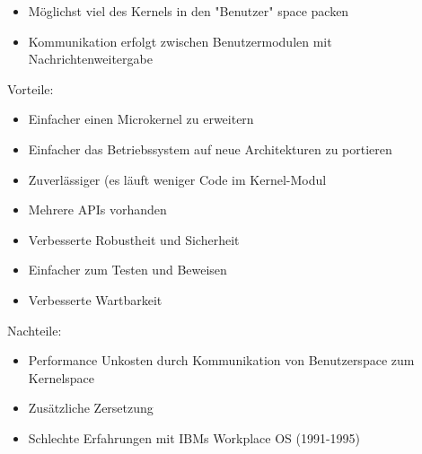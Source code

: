 \documentclass[a4paper]{scrreprt}
\begin{document}
	\begin{itemize}
		\item Möglichst viel des Kernels in den "Benutzer" space packen
		\item Kommunikation erfolgt zwischen Benutzermodulen mit Nachrichtenweitergabe
	\end{itemize}
	
	Vorteile:
		\begin{itemize}
			\item Einfacher einen Microkernel zu erweitern
			\item Einfacher das Betriebssystem auf neue Architekturen zu portieren
			\item Zuverlässiger (es läuft weniger Code im Kernel-Modul
			\item Mehrere APIs vorhanden
			\item Verbesserte Robustheit und Sicherheit
			\item Einfacher zum Testen und Beweisen
			\item Verbesserte Wartbarkeit
		\end{itemize}
	Nachteile:
		\begin{itemize}
			\item Performance Unkosten durch Kommunikation von Benutzerspace zum Kernelspace 
			\item Zusätzliche Zersetzung
			\item Schlechte Erfahrungen mit IBMs Workplace OS (1991-1995)
		\end{itemize}
\end{document}
